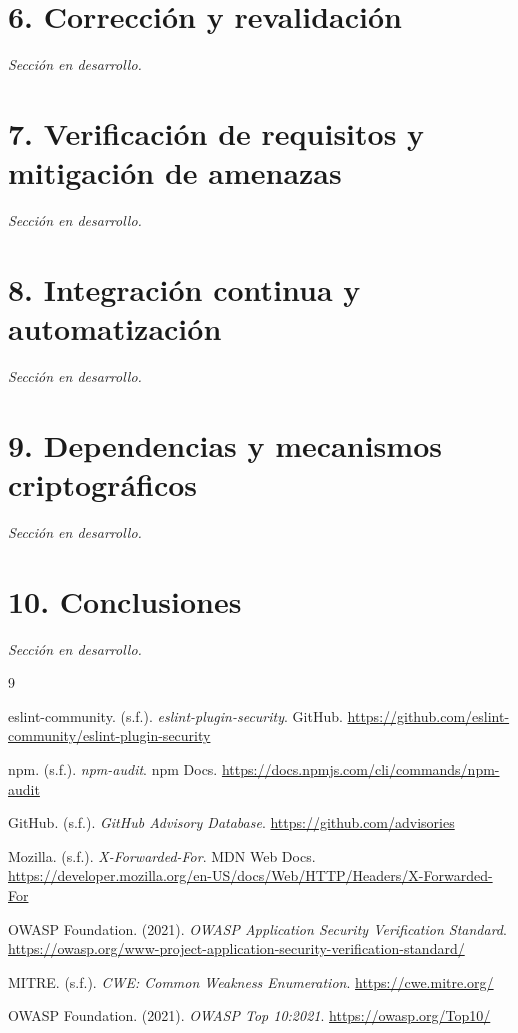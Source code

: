 \documentclass[12pt, letterpaper]{article}
\begin{document}
\section{6. Corrección y revalidación}

\textit{Sección en desarrollo.}

\section{7. Verificación de requisitos y mitigación de amenazas}

\textit{Sección en desarrollo.}

\section{8. Integración continua y automatización}

\textit{Sección en desarrollo.}

\section{9. Dependencias y mecanismos criptográficos}

\textit{Sección en desarrollo.}

\section{10. Conclusiones}

\textit{Sección en desarrollo.}

\newpage
\begin{thebibliography}{9}
\setlength{\itemsep}{5pt}

 eslint-community. (s.f.). \textit{eslint-plugin-security}. GitHub. \url{https://github.com/eslint-community/eslint-plugin-security}

 npm. (s.f.). \textit{npm-audit}. npm Docs. \url{https://docs.npmjs.com/cli/commands/npm-audit}

 GitHub. (s.f.). \textit{GitHub Advisory Database}. \url{https://github.com/advisories}

 Mozilla. (s.f.). \textit{X-Forwarded-For}. MDN Web Docs. \url{https://developer.mozilla.org/en-US/docs/Web/HTTP/Headers/X-Forwarded-For}

 OWASP Foundation. (2021). \textit{OWASP Application Security Verification Standard}. \url{https://owasp.org/www-project-application-security-verification-standard/}

 MITRE. (s.f.). \textit{CWE: Common Weakness Enumeration}. \url{https://cwe.mitre.org/}

 OWASP Foundation. (2021). \textit{OWASP Top 10:2021}. \url{https://owasp.org/Top10/}

\end{thebibliography}
\end{document}
